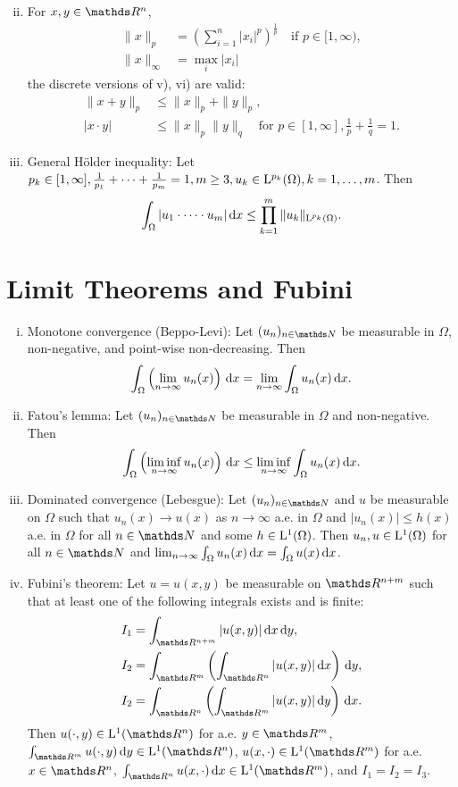 \begin{enumerate}[i)]
$$    $$
  \item For $x,y \in \R^n$,
    \begin{align*}
      \|x\|_p &= \left( \sum_{i = 1}^n |x_i|^p  \right)^{\frac{1}{p}} \quad\text{if } p \in [1,\infty), \\
        \|x\|_{\infty} &= \max_{i} |x_i|
    \end{align*}
    the discrete versions of v), vi) are valid:
    \begin{align*}
      \|x + y\|_p &\leq \|x\|_p + \|y\|_p, \\
      |x \cdot y| &\leq \|x\|_p \|y\|_q \quad\text{for } p \in [1, \infty], \frac{1}{p} + \frac{1}{q} =1.
    \end{align*}
  \item General Hölder inequality: Let $p_k \in [1,\infty], \frac{1}{p_1} + \cdots+ \frac{1}{p_m} = 1, m \geq 3, u_k \in \mathrm{L}^{p_k}(\Omega), k = 1,\dots,m$.
    Then
    $$
    \int_\Omega |u_1 \cdot \cdots \cdot u_m| \, {\operatorname{d}\!{x}} \leq \prod_{k = 1}^m \|u_k\|_{\mathrm{L}^{p_k}(\Omega)}.
    $$
\end{enumerate}

\section{Limit Theorems and Fubini}

\begin{enumerate}[i)]
  \item Monotone convergence (Beppo-Levi): Let $(u_n)_{n \in \N}$ be measurable in $\Omega$, non-negative, and point-wise non-decreasing. Then
    $$
    \int_\Omega \left( \lim_{n \to \infty} u_n(x) \right) \, {\operatorname{d}\!{x}} = \lim_{n \to \infty} \int_\Omega u_n(x) \, {\operatorname{d}\!{x}}.
    $$
  \item Fatou's lemma: Let $(u_n)_{n \in \N}$ be measurable in $\Omega$ and non-negative. Then
    $$
    \int_\Omega \left( \liminf_{n \to \infty} u_n(x) \right) \, {\operatorname{d}\!{x}} 
    \leq \liminf_{n \to \infty} \int_\Omega u_n(x) \, {\operatorname{d}\!{x}}.
    $$
  \item Dominated convergence (Lebesgue): Let $(u_n)_{n \in \N}$ and $u$ be measurable on $\Omega$ such that $u_n(x) \to u(x)$ as $n \to \infty$ a.e. in $\Omega$ and $|u_n(x)| \leq h(x)$ a.e. in $\Omega$ for all $n \in \N$ and some $h \in \mathrm{L}^1(\Omega)$.
    Then $u_n, u \in \mathrm{L}^1(\Omega)$ for all $n \in \N$ and $\lim_{n \to \infty} \int_\Omega u_n(x) \, {\operatorname{d}\!{x}} = \int_\Omega u(x) \, {\operatorname{d}\!{x}}$.
  \item Fubini's theorem: Let $u = u(x,y)$ be measurable on $\R^{n + m}$ such that at least one of the following integrals exists and is finite:
    \begin{align*}
      I_1 &= \int_{\R^{n + m}} |u(x,y)| \d x \d y, \\
      I_2 &= \int_{\R^m} \left( \int_{\R^n} |u(x,y)| \d x \right) \d y, \\
      I_2 &= \int_{\R^n} \left( \int_{\R^m} |u(x,y)| \d y \right) \d x.
    \end{align*}
    Then $u(\cdot,y) \in \Ell^1(\R^n)$ for a.e. $y \in \R^m$, $\int_{\R^m} u(\cdot,y) \d y \in \Ell^1(\R^n)$, $u(x,\cdot) \in \Ell^1(\R^m)$ for a.e. $x \in \R^n$, $\int_{\R^n} u(x, \cdot) \d x \in \Ell^1(\R^m)$, and $I_1 = I_2 = I_3$.
\end{enumerate}

